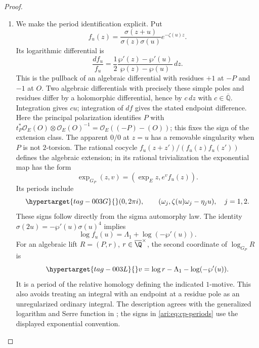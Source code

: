 \begin{proof}
\begin{enumerate}[label=\arabic*.,leftmargin=*]
\item We make the period identification explicit. Put
\[
 f_u(z)=\frac{\sigma(z+u)}{\sigma(z)\sigma(u)}e^{-\zeta(u)z}.
\]
Its logarithmic differential is
\[
 \frac{df_u}{f_u}
 =\frac12\frac{\wp'(z)-\wp'(u)}{\wp(z)-\wp(u)}\,dz.
\]
This is the pullback of an algebraic differential with residues
$+1$ at $-P$ and $-1$ at $O$.
Two algebraic differentials with precisely these simple poles
and residues differ by a holomorphic differential, hence by
$c\,dz$ with $c\in\overline{\mathbb Q}$.
Integration gives $cu$; integration of $df$ gives the stated
endpoint difference.
Here the principal polarization identifies $P$ with
$t_P^*\mathcal O_E(O)\otimes\mathcal O_E(O)^{-1}
=\mathcal O_E((-P)-(O))$; this fixes the sign of the extension class. The apparent $0/0$ at $z=u$
has a removable singularity when $P$ is not $2$-torsion.
The rational cocycle $f_u(z+z')/(f_u(z)f_u(z'))$ defines
the algebraic extension; in its rational trivialization the
exponential map has the form
\[
 \exp_{G_P}(z,v)=(\exp_E z,e^v f_u(z)).
\]
Its periods include
\begin{equation}\hypertarget{tag-003G}{}\label{ari:eq:cp-periods}
 (0,2\pi i),\qquad
 (\omega_j,\zeta(u)\omega_j-\eta_j u),\quad j=1,2.
\end{equation}
These signs follow directly from the sigma automorphy law.
The identity
$\sigma(2u)=-\wp'(u)\sigma(u)^4$ implies
\[
 \log f_u(u)=\Lambda_1+\log(-\wp'(u)).
\]
For an algebraic lift $R=(P,r)$, $r\in\overline\Q^{\times}$,
the second coordinate of $\log_{G_P}R$ is
\begin{equation}\hypertarget{tag-003L}{}\label{ari:eq:cp-v}
 v=\log r-\Lambda_1-\log(-\wp'(u)).
\end{equation}
It is a period of the relative homology defining the indicated
$1$-motive. This also avoids treating an integral with an endpoint
at a residue pole as an unregularized ordinary integral.
The description agrees with the generalized logarithm and
Serre function in \citet[Section~2.3, equations~(2.10)--(2.13), pp.~7--8;
Definitions~2.3--2.4, p.~8; Section~6.1, pp.~26--27,
arXiv v2]{bertolin2022}; the signs in
\eqref{ari:eq:cp-periods} use the displayed exponential convention.
\end{enumerate}
\end{proof}